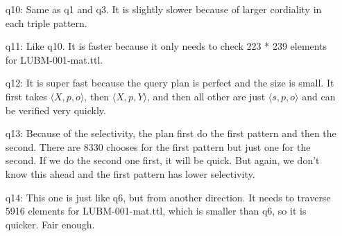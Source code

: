 \documentclass{article}
\begin{document}
\begin{enumerate}
\begin{enumerate}
\item[q10:] Same as q1 and q3. It is slightly slower because of larger cordiality in each triple pattern.
\item[q11:] Like q10. It is faster because it only needs to check 223 * 239 elements for  LUBM-001-mat.ttl. 
\item[q12:] It is super fast because the query plan is perfect and the size is small. It first takes $\langle X, p, o\rangle$, then $\langle X, p, Y\rangle$, and then all other are just $\langle s, p, o\rangle$ and can be verified very quickly.
\item[q13:]  Because of the selectivity, the plan first do the first pattern and then the second. There are 8330 chooses for the first pattern but just one for the second. If we do the second one first, it will be quick. But again, we don't know this ahead and the first pattern has lower selectivity. 
\item[q14:] This one is just like q6, but from another direction. It needs to traverse 5916 elements for LUBM-001-mat.ttl, which is smaller than q6, so it is quicker. Fair enough. 
\end{enumerate}

\end{enumerate}
\end{document}
